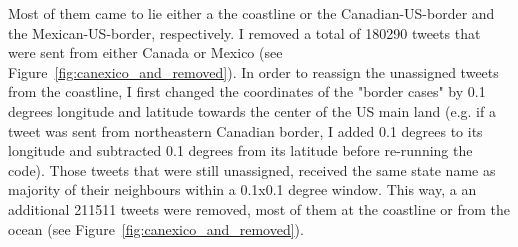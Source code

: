 \documentclass[11pt, a4paper]{report}\usepackage[]{graphicx}\usepackage[]{color}
\begin{document}
Most of them came to lie either a the coastline or the Canadian-US-border and the Mexican-US-border, respectively. I removed a total of 180290 tweets that were sent from either Canada or Mexico (see Figure~\ref{fig:canexico_and_removed}). In order to reassign the unassigned tweets from the coastline, I first changed the coordinates of the "border cases" by 0.1 degrees longitude and latitude towards the center of the US main land (e.g. if a tweet was sent from northeastern Canadian border, I added 0.1 degrees to its longitude and subtracted 0.1 degrees from its latitude before re-running the code). Those tweets that were still unassigned, received the same state name as majority of their neighbours within a 0.1x0.1 degree window. This way, a an additional 211511 tweets were removed, most of them at the coastline or from the ocean (see Figure~\ref{fig:canexico_and_removed}).\newline
\end{document}
